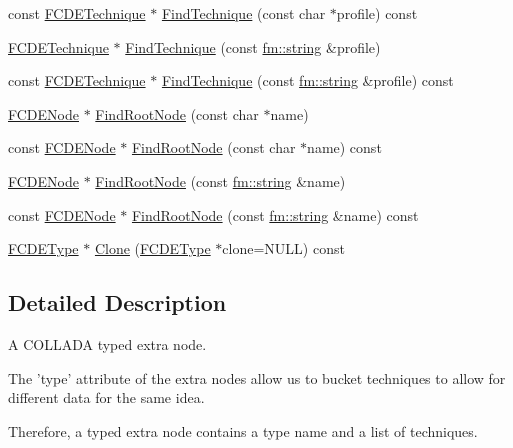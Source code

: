 \begin{DoxyCompactItemize}
\item 
const \hyperlink{classFCDETechnique}{FCDETechnique} $\ast$ \hyperlink{classFCDEType_ab27ea3d162508d235d895f3a53e4aea9}{FindTechnique} (const char $\ast$profile) const 
\item 
\hyperlink{classFCDETechnique}{FCDETechnique} $\ast$ \hyperlink{classFCDEType_af443c71a12bf6f7af4cf3b694b659c3a}{FindTechnique} (const \hyperlink{classfm_1_1stringT}{fm::string} \&profile)
\item 
const \hyperlink{classFCDETechnique}{FCDETechnique} $\ast$ \hyperlink{classFCDEType_a966dc71e64699f2baeebcdc7edb68918}{FindTechnique} (const \hyperlink{classfm_1_1stringT}{fm::string} \&profile) const 
\item 
\hyperlink{classFCDENode}{FCDENode} $\ast$ \hyperlink{classFCDEType_a4e1e66bc55d36ec22d34f8956de6c90f}{FindRootNode} (const char $\ast$name)
\item 
const \hyperlink{classFCDENode}{FCDENode} $\ast$ \hyperlink{classFCDEType_abee65394ef3b73fa041beb7046a45f17}{FindRootNode} (const char $\ast$name) const 
\item 
\hyperlink{classFCDENode}{FCDENode} $\ast$ \hyperlink{classFCDEType_a14279bc9ac8eb1cefc1a7ca7f19926f4}{FindRootNode} (const \hyperlink{classfm_1_1stringT}{fm::string} \&name)
\item 
const \hyperlink{classFCDENode}{FCDENode} $\ast$ \hyperlink{classFCDEType_a260a69d1721c699b991caf6aa259e76b}{FindRootNode} (const \hyperlink{classfm_1_1stringT}{fm::string} \&name) const 
\item 
\hyperlink{classFCDEType}{FCDEType} $\ast$ \hyperlink{classFCDEType_ad305c941aab8caa99be240b88335dafb}{Clone} (\hyperlink{classFCDEType}{FCDEType} $\ast$clone=NULL) const 
\end{DoxyCompactItemize}


\subsection{Detailed Description}
A COLLADA typed extra node.

The 'type' attribute of the extra nodes allow us to bucket techniques to allow for different data for the same idea.

Therefore, a typed extra node contains a type name and a list of techniques. 

